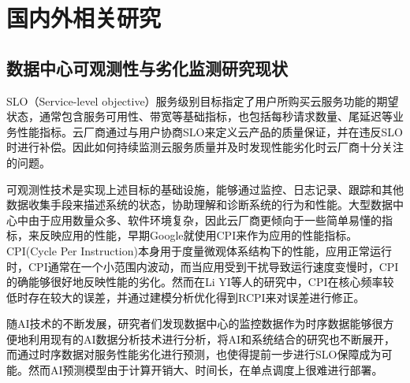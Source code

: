 \section{国内外相关研究}


\subsection{数据中心可观测性与劣化监测研究现状}


SLO（Service-level objective）服务级别目标指定了用户所购买云服务功能的期望状态，通常包含服务可用性、带宽等基础指标，也包括每秒请求数量、尾延迟等业务性能指标。云厂商通过与用户协商SLO来定义云产品的质量保证，并在违反SLO时进行补偿。因此如何持续监测云服务质量并及时发现性能劣化时云厂商十分关注的问题。

可观测性技术是实现上述目标的基础设施，能够通过监控、日志记录、跟踪和其他数据收集手段来描述系统的状态，协助理解和诊断系统的行为和性能。大型数据中心中由于应用数量众多、软件环境复杂，因此云厂商更倾向于一些简单易懂的指标，来反映应用的性能，早期Google就使用CPI来作为应用的性能指标\citep{zhang2013cpi2}。CPI(Cycle Per Instruction)本身用于度量微观体系结构下的性能，应用正常运行时，CPI通常在一个小范围内波动，而当应用受到干扰导致运行速度变慢时，CPI的确能够很好地反映性能的劣化。然而在Li YI等人的研究中\citep{yi2020cpi}，CPI在核心频率较低时存在较大的误差，并通过建模分析优化得到RCPI来对误差进行修正。

随AI技术的不断发展，研究者们发现数据中心的监控数据作为时序数据能够很方便地利用现有的AI数据分析技术进行分析，将AI和系统结合的研究也不断展开，而通过时序数据对服务性能劣化进行预测\citep{qiu2020firm, zhou2022aquatope, wang2022deepscaling, gan2021sage}，也使得提前一步进行SLO保障成为可能。然而AI预测模型由于计算开销大、时间长，在单点调度上很难进行部署。

